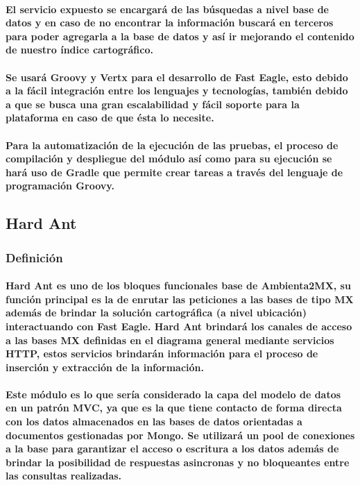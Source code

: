     \paragraph{El servicio expuesto se encargará de las búsquedas a nivel base de datos y en caso de no encontrar la información buscará en terceros para poder agregarla a la base de datos y así ir mejorando el contenido de nuestro índice cartográfico.}
    \paragraph{Se usará Groovy y Vertx para el desarrollo de Fast Eagle, esto debido a la fácil integración entre los lenguajes y tecnologías, también debido a que se busca una gran escalabilidad y fácil soporte para la plataforma en caso de que ésta lo necesite.}
    \paragraph{Para la automatización de la ejecución de las pruebas, el proceso de compilación y despliegue del módulo así como para su ejecución se hará uso de Gradle que permite crear tareas a través del lenguaje de programación Groovy.}
  \subsection{Hard Ant}
    \subsubsection{Definición}
      \paragraph{Hard Ant es uno de los bloques funcionales base de Ambienta2MX, su función principal es la de enrutar las peticiones a las bases de tipo MX además de brindar la solución cartográfica (a nivel ubicación) interactuando con Fast Eagle. Hard Ant brindará los canales de acceso a las bases MX definidas en el diagrama general mediante servicios HTTP, estos servicios brindarán información para el proceso de inserción y extracción de la información. }
      \paragraph{Este módulo es lo que sería considerado la capa del modelo de datos en un patrón MVC, ya que es la que tiene contacto de forma directa con los datos almacenados en las bases de datos orientadas a documentos gestionadas por Mongo. Se utilizará un pool de conexiones a la base para garantizar el acceso o escritura a los datos además de brindar la posibilidad de respuestas asincronas y no bloqueantes entre las consultas realizadas.}
